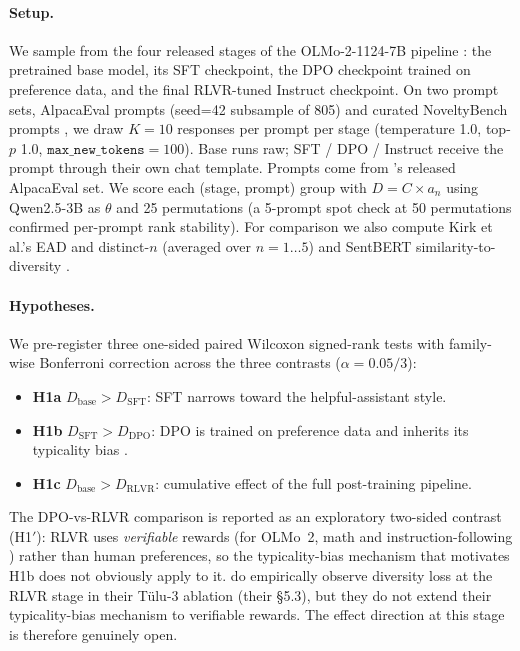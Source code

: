 \paragraph{Setup.} We sample from the four released stages of the OLMo-2-1124-7B pipeline \citep{olmo2024olmo2}: the pretrained base model, its SFT checkpoint, the DPO checkpoint trained on preference data, and the final RLVR-tuned Instruct checkpoint. On two prompt sets, \olmoAlpacaN{} AlpacaEval prompts (seed=42 subsample of 805) and \olmoNbCuratedN{} curated NoveltyBench prompts \citep{zhang2025noveltybench}, we draw $K{=}10$ responses per prompt per stage (temperature 1.0, top-$p$ 1.0, $\texttt{max\_new\_tokens}{=}100$). Base runs raw; SFT / DPO / Instruct receive the prompt through their own chat template. Prompts come from \citet{dubois2024alpacafarm}'s released AlpacaEval set. We score each (stage, prompt) group with $D = C \times a_n$ using Qwen2.5-3B as $\theta$ and 25 permutations (a 5-prompt spot check at 50 permutations confirmed per-prompt rank stability). For comparison we also compute Kirk et al.'s EAD and distinct-$n$ (averaged over $n{=}1\ldots5$) and SentBERT similarity-to-diversity \citep{reimers2019sbert}.

\paragraph{Hypotheses.} We pre-register three one-sided paired Wilcoxon signed-rank tests \citep{dror2018hitchhiker} with family-wise Bonferroni correction across the three contrasts \citep{dror2017replicability} ($\alpha = 0.05/3$):

\begin{itemize}[nosep]
    \item \textbf{H1a} $D_{\mathrm{base}} > D_{\mathrm{SFT}}$: SFT narrows toward the helpful-assistant style.
    \item \textbf{H1b} $D_{\mathrm{SFT}} > D_{\mathrm{DPO}}$: DPO is trained on preference data and inherits its typicality bias \citep{zhang2025verbalizedsampling}.
    \item \textbf{H1c} $D_{\mathrm{base}} > D_{\mathrm{RLVR}}$: cumulative effect of the full post-training pipeline.
\end{itemize}

The DPO-vs-RLVR comparison is reported as an exploratory two-sided contrast (H1$'$): RLVR uses \emph{verifiable} rewards (for OLMo~2, math and instruction-following \citep{olmo2024olmo2}) rather than human preferences, so the typicality-bias mechanism that motivates H1b does not obviously apply to it. \citet{zhang2025verbalizedsampling} do empirically observe diversity loss at the RLVR stage in their T\"ulu-3 ablation (their \S5.3), but they do not extend their typicality-bias mechanism to verifiable rewards. The effect direction at this stage is therefore genuinely open.

